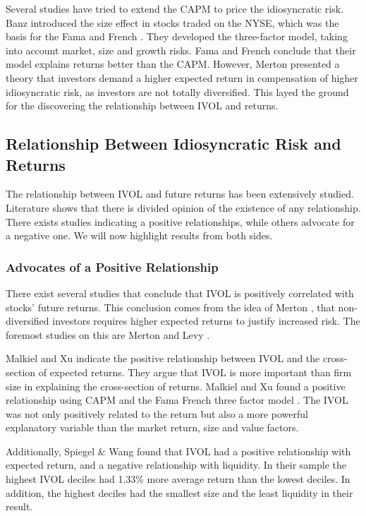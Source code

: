 Several studies have tried to extend the CAPM to price the idiosyncratic risk. Banz \cite{banz} introduced the size effect in stocks traded on the NYSE, which was the basis for the Fama and French \cite{famafrench}. They developed the three-factor model, taking into account market, size and growth risks. Fama and French \cite{famafrench} conclude that their model explains returns better than the CAPM. However, Merton \cite{merton87} presented a theory that investors demand a higher expected return in compensation of higher idiosyncratic risk, as investors are not totally diversified. This layed the ground for the discovering the relationship between IVOL and returns.

\subsection{Relationship Between Idiosyncratic Risk and Returns}
The relationship between IVOL and future returns has been extensively studied. Literature shows that there is divided opinion of the existence of any relationship. There exists studies indicating a positive relationships, while others advocate for a negative one. We will now highlight results from both sides.

\subsubsection{Advocates of a Positive Relationship}
There exist several studies that conclude that IVOL is positively correlated with stocks' future returns. This conclusion comes from the idea of Merton \cite{merton87}, that non-diversified investors requires higher expected returns to justify increased risk. The foremost studies on this are Merton \cite{merton73} and Levy \cite{levy}.

Malkiel and Xu \cite{malkielxu02} indicate the positive relationship between IVOL and the cross-section of expected returns. They argue that IVOL is more important than firm size in explaining the cross-section of returns. Malkiel and Xu \cite{malkielxu04} found a positive relationship using CAPM and the Fama French three factor model \cite{famafrench}. The IVOL was not only positively related to the return but also a more powerful explanatory variable than the market return, size and value factors.
 
Additionally, Spiegel & Wang \cite{spiegelwang} found that IVOL had a positive relationship with expected return, and a negative relationship with liquidity. In their sample the highest IVOL deciles had 1.33\% more average return than the lowest deciles. In addition, the highest deciles had the smallest size and the least liquidity in their result. 

